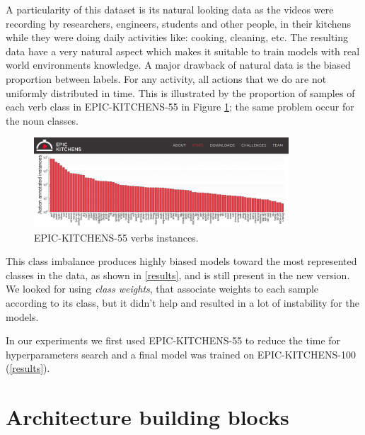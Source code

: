 \documentclass[12pt, a4paper]{report}
\begin{document}
				A particularity of this dataset is its natural looking data as the videos were recording by researchers, engineers, students and other people, in their kitchens while they were doing daily activities like: cooking, cleaning, etc.
				The resulting data have a very natural aspect which makes it suitable to train models with real world environments knowledge.
				A major drawback of natural data is the biased proportion between labels.
				For any activity, all actions that we do are not uniformly distributed in time.
				This is illustrated by the proportion of samples of each verb class in EPIC-KITCHENS-55 in Figure \ref{epic_55_imbalance}; the same problem occur for the noun classes.
				\begin{figure}[h!]
					\centering
					\includegraphics[width=0.85\textwidth]{EPIC-55 data imbalance.png}
					\caption{EPIC-KITCHENS-55 verbs instances.}
					\label{epic_55_imbalance}
				\end{figure}
				This class imbalance produces highly biased models toward the most represented classes in the data, as shown in \ref{results}, and is still present in the new version.
				We looked for using {\itshape class weights}, that associate weights to each sample according to its class, but it didn't help and resulted in a lot of instability for the models.
				\par
				In our experiments we first used EPIC-KITCHENS-55 to reduce the time for hyperparameters search and a final model was trained on EPIC-KITCHENS-100 (\ref{results}).
		\section{Architecture building blocks}
\end{document}
